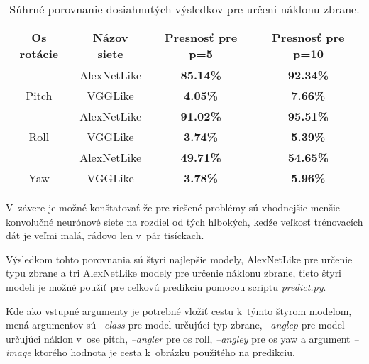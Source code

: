\begin{table}[H]
    \centering
    \begin{tabular}{|c|c|c|c|}
        \hline
        {\color[HTML]{000000} Os rotácie}              & {\color[HTML]{000000} Názov siete} & {\color[HTML]{000000} Presnosť pre p=5} & {\color[HTML]{000000} Presnosť pre p=10} \\ \hline
        {\color[HTML]{000000} }                        & {\color[HTML]{000000} AlexNetLike} & {\color[HTML]{009901} \textbf{85.14\%}} & {\color[HTML]{009901} \textbf{92.34\%}}  \\
        \multirow{-2}{*}{{\color[HTML]{000000} Pitch}} & {\color[HTML]{000000} VGGLike}     & {\color[HTML]{9A0000} \textbf{4.05\%}}  & {\color[HTML]{9A0000} \textbf{7.66\%}}   \\ \hline
        {\color[HTML]{000000} }                        & {\color[HTML]{000000} AlexNetLike} & {\color[HTML]{009901} \textbf{91.02\%}} & {\color[HTML]{009901} \textbf{95.51\%}}  \\
        \multirow{-2}{*}{{\color[HTML]{000000} Roll}}  & {\color[HTML]{000000} VGGLike}     & {\color[HTML]{9A0000} \textbf{3.74\%}}  & {\color[HTML]{9A0000} \textbf{5.39\%}}   \\ \hline
        {\color[HTML]{000000} }                        & {\color[HTML]{000000} AlexNetLike} & {\color[HTML]{009901} \textbf{49.71\%}} & {\color[HTML]{009901} \textbf{54.65\%}}  \\
        \multirow{-2}{*}{{\color[HTML]{000000} Yaw}}   & {\color[HTML]{000000} VGGLike}     & {\color[HTML]{9A0000} \textbf{3.78\%}}  & {\color[HTML]{9A0000} \textbf{5.96\%}}   \\ \hline
    \end{tabular}
    \caption{Súhrné porovnanie dosiahnutých výsledkov pre určeni náklonu zbrane.}
    \label{tab:allresultsangle}
\end{table}

V~závere je možné konštatovať že pre riešené problémy sú vhodnejšie menšie konvolučné neurónové siete na rozdiel od tých hlbokých, kedže
    veľkosť trénovacích dát je veľmi malá, rádovo len v~pár tisíckach.

Výsledkom tohto porovnania sú štyri najlepšie modely, AlexNetLike pre určenie typu zbrane a tri AlexNetLike modely pre určenie náklonu zbrane,
    tieto štyri modeli je možné použiť pre celkovú predikciu pomocou scriptu \textit{predict.py}.

Kde ako vstupné argumenty je potrebné vložiť cestu k~týmto štyrom modelom, mená argumentov sú \textit{--class} pre model určujúci typ zbrane,
    \textit{--anglep} pre model určujúci náklon v~ose pitch, \textit{--angler} pre os roll, \textit{--angley} pre os yaw a argument
    \textit{--image} ktorého hodnota je cesta k~obrázku použitého na predikciu.
